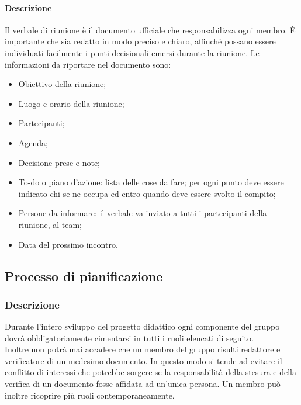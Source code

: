 \paragraph{Descrizione}
Il verbale di riunione è il documento ufficiale che responsabilizza ogni membro.
È importante che sia redatto in modo preciso e chiaro, affinché possano essere individuati facilmente i punti decisionali emersi durante la riunione.
Le informazioni da riportare nel documento sono:
\begin{itemize}
\item
Obiettivo della riunione;
\item
Luogo e orario della riunione;
\item
Partecipanti;
\item
Agenda;
\item
Decisione prese e note;
\item
To-do o piano d’azione: lista delle cose da fare; per ogni punto deve essere indicato chi se ne occupa ed entro quando deve essere svolto il compito;
\item
Persone da informare: il verbale va inviato a tutti i partecipanti della riunione, al team;
\item
Data del prossimo incontro.
\end{itemize}

\subsection{Processo di pianificazione}

\subsubsection{Descrizione}
Durante l'intero sviluppo del progetto didattico ogni componente del gruppo 
dovrà obbligatoriamente cimentarsi in tutti i ruoli elencati di seguito. \\
Inoltre non potrà mai accadere che un membro del gruppo risulti redattore e verificatore di un medesimo documento. 
In questo modo si tende ad evitare il conflitto di interessi che potrebbe sorgere se la responsabilità della stesura 
e della verifica di un documento fosse affidata ad un'unica persona.
Un membro può inoltre ricoprire più ruoli contemporaneamente.

